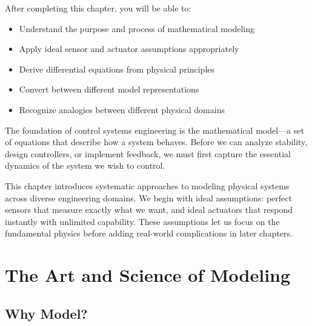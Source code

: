 
\label{ch:modeling}

\begin{keyconceptbox}[title=Learning Objectives]
After completing this chapter, you will be able to:
\begin{itemize}
    \item Understand the purpose and process of mathematical modeling
    \item Apply ideal sensor and actuator assumptions appropriately
    \item Derive differential equations from physical principles
    \item Convert between different model representations
    \item Recognize analogies between different physical domains
\end{itemize}
\end{keyconceptbox}

The foundation of control systems engineering is the mathematical model---a set of equations that describe how a system behaves. Before we can analyze stability, design controllers, or implement feedback, we must first capture the essential dynamics of the system we wish to control.

This chapter introduces systematic approaches to modeling physical systems across diverse engineering domains. We begin with ideal assumptions: perfect sensors that measure exactly what we want, and ideal actuators that respond instantly with unlimited capability. These assumptions let us focus on the fundamental physics before adding real-world complications in later chapters.

\chapter{The Art and Science of Modeling}
\label{ch:modeling_philosophy}

\section{Why Model?}

